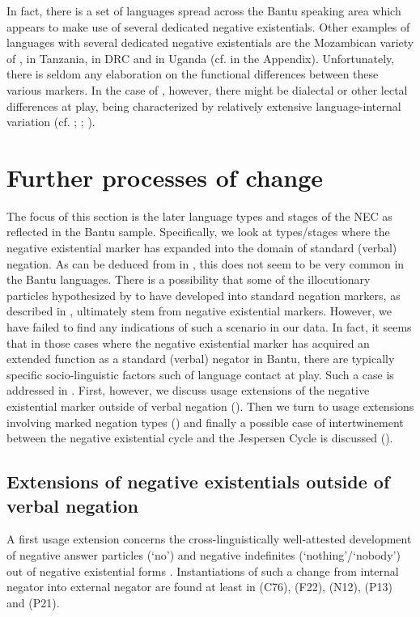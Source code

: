 \documentclass[output=paper]{langsci/langscibook}
\begin{document}
%
In fact, there is a set of
languages spread across the Bantu speaking area which appears to make use
of several dedicated negative existentials. Other examples of languages
with several dedicated negative existentials are the Mozambican variety of
,  in Tanzania,  in DRC and  in
Uganda (cf.  in the Appendix). Unfortunately, there is
seldom any elaboration on the functional differences between these various
markers. In the case of , however, there might be dialectal or
other lectal differences at play,  being characterized by
relatively extensive language-internal variation (cf.
\citealt[30--35]{Morrison2011}; \citealt{Morrison2015};
\citealt{Mitterhofer2013}).

\section{Further processes of change}\label{sec:1:6}
%
The focus of this section is the later language types and stages of the NEC
as reflected in the Bantu sample. Specifically, we look at types\slash stages
where the negative existential marker has expanded into the domain of
standard (verbal) negation. As can be deduced from
 in , this does not seem to be 
very common in the Bantu languages. There is a possibility that some
of the illocutionary particles hypothesized by \citet{Guldemann1999} to
have developed into standard negation markers, as described in
, ultimately stem from negative existential markers.
However, we have failed to find any indications of such a scenario in our
data. In fact, it seems that in those cases where the negative existential
marker has acquired an extended function as a standard (verbal) negator in
Bantu, there are typically specific socio-linguistic factors such of
language contact at play. Such a case is addressed in
. First, however, we discuss usage extensions of the
negative existential marker outside of verbal negation
(). Then we turn to usage extensions involving marked
negation types () and finally a possible case of
intertwinement between the negative existential cycle and the Jespersen
Cycle is discussed ().

\subsection{Extensions of negative existentials outside of verbal
negation}\label{sec:1:6.1}
%
A first usage extension concerns the cross-linguistically well-attested
development of negative answer particles (`no') and negative indefinites
(`no\-thing'\slash `no\-bo\-dy') out of negative existential forms
\parencites(see)()
{Schwegler1988}{Croft1991}{Veselinova2013}{Veselinova2014}{Veselinova2016}.
Instantiations of such a change from internal negator into external negator
are found at least in  (C76),  (F22), 
(N12),  (P13) and  (P21).
\end{document}
